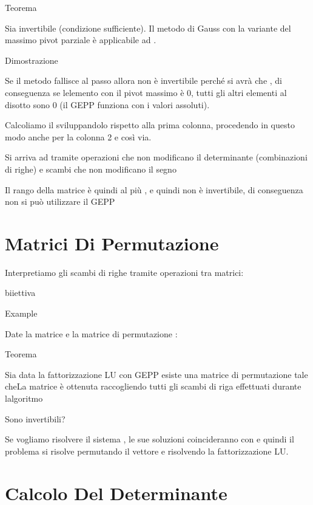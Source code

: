 \documentclass[
]{article}
\begin{document}
Teorema

Sia {} invertibile (condizione sufficiente). Il metodo di Gauss con la
variante del massimo pivot parziale è applicabile ad {}.

Dimostrazione

Se il metodo fallisce al passo {} allora {} non è invertibile perché si
avrà che {}, di conseguenza se l\textquotesingle elemento con il pivot
massimo è 0, tutti gli altri elementi al disotto sono 0 (il GEPP
funziona con i valori assoluti).

Calcoliamo il {} sviluppandolo rispetto alla prima colonna, procedendo
in questo modo anche per la colonna 2 e così via.

Si arriva ad {} tramite operazioni che non modificano il determinante
(combinazioni di righe) e scambi che non modificano il segno\\
{}

Il rango della matrice è quindi al più {}, e quindi non è invertibile,
di conseguenza non si può utilizzare il GEPP

\hypertarget{matrici-di-permutazione}{%
\section{Matrici Di Permutazione}\label{matrici-di-permutazione}}

Interpretiamo gli scambi di righe tramite operazioni tra matrici:

{} biiettiva\\
{}

Example

{}

Date la matrice {} e la matrice di permutazione {}:

Teorema

Sia data la fattorizzazione LU con GEPP esiste una matrice di
permutazione {} tale che{}La matrice {} è ottenuta raccogliendo tutti
gli scambi di riga effettuati durante l\textquotesingle algoritmo

Sono invertibili?

Se vogliamo risolvere il sistema {}, le sue soluzioni coincideranno con
{} e quindi il problema si risolve permutando il vettore {} e risolvendo
la fattorizzazione LU.

\hypertarget{calcolo-del-determinante}{%
\section{Calcolo Del Determinante}\label{calcolo-del-determinante}}
\end{document}
